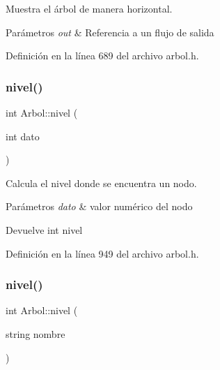 Muestra el árbol de manera horizontal. 


\begin{DoxyParams}{Parámetros}
{\em out} & Referencia a un flujo de salida \\
\hline
\end{DoxyParams}


Definición en la línea 689 del archivo arbol.\+h.

\mbox{\label{classArbol_accd2dd2f8012067c1a2d77fd14c64546}} 
\subsubsection{\texorpdfstring{nivel()}{nivel()}\hspace{0.1cm}{\footnotesize\ttfamily [1/2]}}
{\footnotesize\ttfamily int Arbol\+::nivel (\begin{DoxyParamCaption}\item[{int}]{dato }\end{DoxyParamCaption})}



Calcula el nivel donde se encuentra un nodo. 


\begin{DoxyParams}{Parámetros}
{\em dato} & valor numérico del nodo \\
\hline
\end{DoxyParams}
\begin{DoxyReturn}{Devuelve}
int nivel 
\end{DoxyReturn}


Definición en la línea 949 del archivo arbol.\+h.

\mbox{\label{classArbol_a3a8a414e8e3f45bf90c481649928a86d}} 
\subsubsection{\texorpdfstring{nivel()}{nivel()}\hspace{0.1cm}{\footnotesize\ttfamily [2/2]}}
{\footnotesize\ttfamily int Arbol\+::nivel (\begin{DoxyParamCaption}\item[{string}]{nombre }\end{DoxyParamCaption})}



